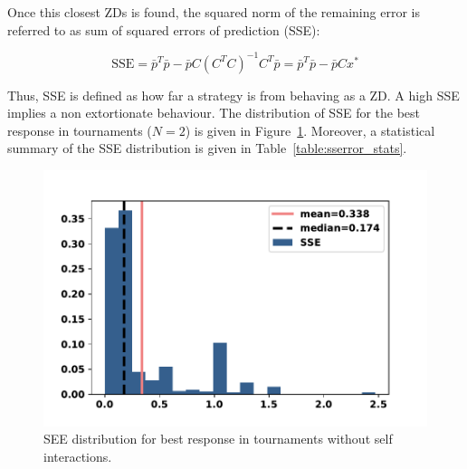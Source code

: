\documentclass[10pt]{article}
\begin{document}
Once this closest ZDs is found, the squared norm of the remaining error is referred to as sum of squared errors
of prediction (SSE):

\begin{equation}\label{eqn:x_SSError_formula}
    \text{SSE} = {\bar{p}} ^ T \bar{p} -
           \bar{p} C \left(C ^ T C \right) ^ {-1} C ^ T \bar{p}
         = {\bar{p}} ^ T \bar{p} - \bar{p} C x ^ *
\end{equation}

Thus, SSE is defined as how far a strategy is from behaving as a ZD. A
high SSE implies a non extortionate behaviour.
The distribution of SSE for the best response in tournaments
(\(N=2\)) is given in
Figure~\ref{fig:sse_distributions}. Moreover, a statistical summary of the SSE
distribution is given in Table~\ref{table:sserror_stats}.

\begin{table}[!htbp]
    \begin{center}
    \end{center}
    \caption{SSE of best response memory-one when \(N=2\)}\label{table:sserror_stats}
\end{table}

\begin{figure}[!htbp]
    \begin{center}
        \includegraphics[width=.65\linewidth]{img/best_respones_sserror.pdf}
    \end{center}
    \caption{SEE distribution for best response in tournaments without self interactions.}\label{fig:sse_distributions}
\end{figure}
\end{document}

